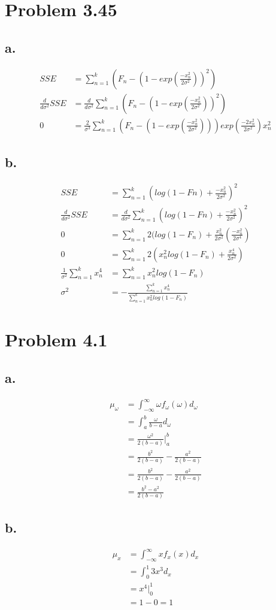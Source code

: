 \documentclass[12pt]{article}
\begin{document}
\section*{Problem 3.45}
\subsection*{a.}
\begin{align*}
  SSE &= \sum_{n=1}^k \left( F_n - (1 - exp(\frac{-x_n^2}{2\sigma^2}))^2 \right) \\
  \frac{d}{d\sigma^2}SSE &= \frac{d}{d\sigma^2}\sum_{n=1}^k \left( F_n - (1 - exp(\frac{-x_n^2}{2\sigma^2}))^2 \right) \\
  0 &= \frac{2}{\sigma^3}\sum_{n=1}^k \left( F_n - (1 - exp(\frac{-x_n^2}{2\sigma^2}))\right)exp(\frac{-2x_n^2}{2\sigma^2})x_n^2
\end{align*}

\subsection*{b.}
\begin{align*}
  SSE &= \sum_{n=1}^k \left( log(1-Fn) + \frac{-x_n^2}{2\sigma^2} \right)^2 \\
  \frac{d}{d\sigma^2}SSE &= \frac{d}{d\sigma^2} \sum_{n=1}^k \left( log(1-Fn) + \frac{-x_n^2}{2\sigma^2} \right)^2 \\
  0 &= \sum_{n=1}^k 2(log(1-F_n) + \frac{x_n^2}{2\sigma^2}(\frac{-x_n^2}{2\sigma^4}) \\
  0 &= \sum_{n=1}^k 2(x_n^2 log(1-F_n) + \frac{x_n^4}{2\sigma^2}) \\
  \frac{1}{\sigma^2} \sum_{n=1}^k x_n^4 &= \sum_{n=1}^k x_n^2 log(1-F_n) \\
  \sigma^2 &= -\frac{\sum_{n=1}^k x_n^4}{\sum_{n=1}^k x_n^2 log(1-F_n)}
\end{align*}
\section*{Problem 4.1}
\subsection*{a.}
\begin{align*}
  \mu_\omega &= \int_{-\infty}^{\infty} \omega f_\omega(\omega) d_\omega \\
   &= \int_{a}^{b} \frac{\omega}{b-a} d_\omega \\
   &= \frac{\omega^2}{2(b-a)} \big|_a^b \\
   &= \frac{b^2}{2(b-a)}-\frac{a^2}{2(b-a)} \\
   &= \frac{b^2}{2(b-a)}-\frac{a^2}{2(b-a)} \\
   &= \frac{b^2-a^2}{2(b-a)}
\end{align*}
\subsection*{b.}
\begin{align*}
  \mu_x &= \int_{-\infty}^{\infty} x f_x(x) d_x \\
   &= \int_{0}^{1} 3x^3 d_x \\
   &= x^4 \big|_0^1 \\
   &= 1-0 = 1 
 \end{align*}
\end{document}
